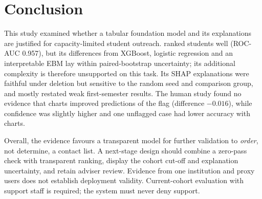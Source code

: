 \section{Conclusion}
\label{sec:conclusion}

This study examined whether a tabular foundation model and its explanations are justified for
capacity-limited student outreach. \tabicl ranked students well (ROC-AUC 0.957), but its differences
from XGBoost, logistic regression and an interpretable EBM lay within paired-bootstrap uncertainty;
its additional complexity is therefore unsupported on this task. Its SHAP explanations were
faithful under deletion but sensitive to the random seed and comparison group, and mostly restated
weak first-semester results. The human study found no evidence that charts improved predictions of
the flag (difference $-0.016$), while confidence was slightly higher and one unflagged case had
lower accuracy with charts.

Overall, the evidence favours a transparent model for further validation to \emph{order}, not
determine, a contact list. A next-stage design should combine a zero-pass check with transparent
ranking, display the cohort cut-off and explanation uncertainty, and retain adviser review.
Evidence from one institution and proxy users does not establish deployment validity.
Current-cohort evaluation with support staff is required; the system must never deny support.
